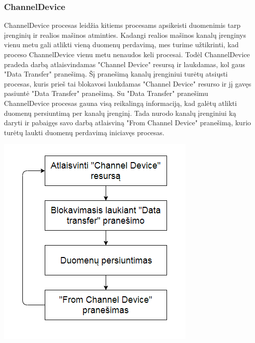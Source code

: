 \documentclass{scrartcl}
\begin{document}
      \subsubsection{ChannelDevice}
        ChannelDevice procesas leidžia kitiems procesams apsikeisti duomenimis tarp įrenginių ir realios mašinos atminties. Kadangi realios mašinos kanalų įrenginys vienu metu gali atlikti vieną duomenų perdavimą, mes turime užtikrinti, kad proceso ChannelDevice vienu metu nenaudos keli procesai. Todėl ChannelDevice pradeda darbą atlaisvindamas "Channel Device" resursą ir laukdamas, kol gaus "Data Transfer" pranešimą. Šį pranešimą kanalų įrenginiui turėtų atsiųsti procesas, kuris prieš tai blokavosi laukdamas "Channel Device" resurso ir jį gavęs pasiuntė "Data Transfer" pranešimą. Su "Data Transfer" pranešimu ChannelDevice procesas gauna visą reikalingą informaciją, kad galėtų atlikti duomenų persiuntimą per kanalų įrenginį. Tada nurodo kanalų įrenginiui ką daryti ir pabaigęs savo darbą atlaisviną "From Channel Device" pranešimą, kurio turėtų laukti duomenų perdavimą iniciavęs procesas.
        \begin{center}
          \includegraphics[scale=1]{ChannelDevice}
        \end{center}
\end{document}
